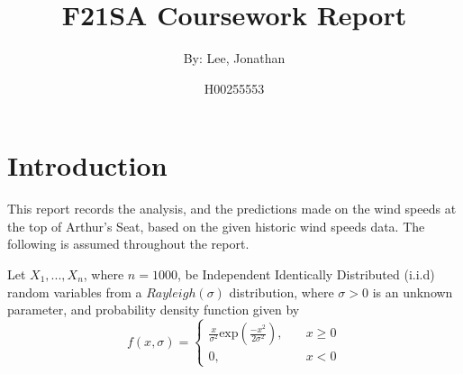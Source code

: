 \documentclass[11pt]{article}
\title{\textbf{F21SA Coursework Report}}
\author{By: Lee, Jonathan}
\date{H00255553}
\begin{document}
\newpage

\section{Introduction}
This report records the analysis, and the predictions made on the wind speeds at the top of Arthur's Seat, based on the given historic wind speeds data. The following is assumed throughout the report.\\
\par Let $X_{1},...,X_{n}$, where $n=1000$, be Independent Identically Distributed (i.i.d) random variables from a $Rayleigh(\sigma)$ distribution, where $\sigma>0$ is an unknown parameter, and probability density function given by
\begin{equation}
    f(x,\sigma) =
    \begin{cases}
        \frac{x}{\sigma^{2}}\mathrm{exp}\left(\frac{-x^{2}}{2\sigma^{2}}\right), & \quad x\geq0\\
        0,  & \quad x<0
    \end{cases}
\end{equation}
\end{document}
